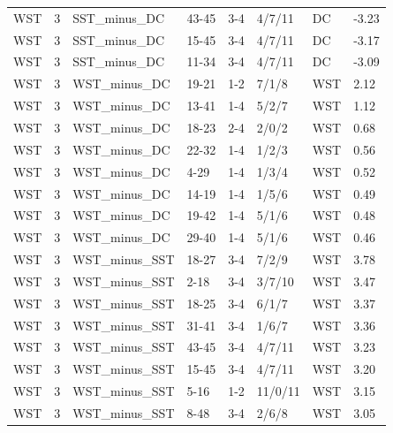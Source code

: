\begin{table}[!h]
\begin{tabular}[t]{lrllllll}
WST & 3 & SST_minus_DC & 43-45 & 3-4 & 4/7/11 & DC & -3.23\\
WST & 3 & SST_minus_DC & 15-45 & 3-4 & 4/7/11 & DC & -3.17\\
WST & 3 & SST_minus_DC & 11-34 & 3-4 & 4/7/11 & DC & -3.09\\
WST & 3 & WST_minus_DC & 19-21 & 1-2 & 7/1/8 & WST & 2.12\\
WST & 3 & WST_minus_DC & 13-41 & 1-4 & 5/2/7 & WST & 1.12\\
\addlinespace
WST & 3 & WST_minus_DC & 18-23 & 2-4 & 2/0/2 & WST & 0.68\\
WST & 3 & WST_minus_DC & 22-32 & 1-4 & 1/2/3 & WST & 0.56\\
WST & 3 & WST_minus_DC & 4-29 & 1-4 & 1/3/4 & WST & 0.52\\
WST & 3 & WST_minus_DC & 14-19 & 1-4 & 1/5/6 & WST & 0.49\\
WST & 3 & WST_minus_DC & 19-42 & 1-4 & 5/1/6 & WST & 0.48\\
\addlinespace
WST & 3 & WST_minus_DC & 29-40 & 1-4 & 5/1/6 & WST & 0.46\\
WST & 3 & WST_minus_SST & 18-27 & 3-4 & 7/2/9 & WST & 3.78\\
WST & 3 & WST_minus_SST & 2-18 & 3-4 & 3/7/10 & WST & 3.47\\
WST & 3 & WST_minus_SST & 18-25 & 3-4 & 6/1/7 & WST & 3.37\\
WST & 3 & WST_minus_SST & 31-41 & 3-4 & 1/6/7 & WST & 3.36\\
\addlinespace
WST & 3 & WST_minus_SST & 43-45 & 3-4 & 4/7/11 & WST & 3.23\\
WST & 3 & WST_minus_SST & 15-45 & 3-4 & 4/7/11 & WST & 3.20\\
WST & 3 & WST_minus_SST & 5-16 & 1-2 & 11/0/11 & WST & 3.15\\
WST & 3 & WST_minus_SST & 8-48 & 3-4 & 2/6/8 & WST & 3.05\\
\bottomrule
\end{tabular}
\end{table}
